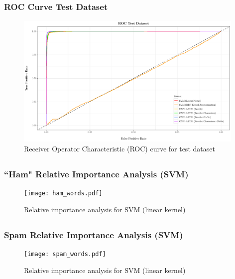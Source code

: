 \documentclass{beamer}
\begin{document}
\subsection{}
\begin{framefont}{\footnotesize}
	\begin{frame}
		\frametitle{ROC Curve Test Dataset}
			\begin{figure}
			\captionsetup{justification=centering}
			\includegraphics[width=11cm]{roc_test.pdf}
			\caption{Receiver Operator Characteristic (ROC) curve for test dataset}
		\end{figure}
	\end{frame}
\end{framefont}

\subsection{}
\begin{framefont}{\footnotesize}
	\begin{frame}
		\frametitle{``Ham" Relative Importance Analysis (SVM)}
		\centering
		\begin{figure}
			\captionsetup{justification=centering}
			\texttt{[image: ham\_words.pdf]}
			\caption{Relative importance analysis for SVM (linear kernel)}
		\end{figure}
	\end{frame}
\end{framefont}

\subsection{}
\begin{framefont}{\footnotesize}
	\begin{frame}
		\frametitle{Spam Relative Importance Analysis (SVM)}
		\centering
		\begin{figure}
			\captionsetup{justification=centering}
			\texttt{[image: spam\_words.pdf]}
			\caption{Relative importance analysis for SVM (linear kernel)}
		\end{figure}
	\end{frame}
\end{framefont}
\end{document}
